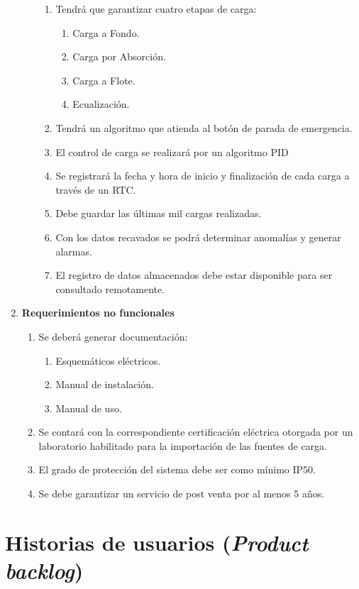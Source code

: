 \documentclass[11pt]{charter}
\begin{document}
\begin{enumerate}
\begin{enumerate}[label*=\arabic*.]
\begin{enumerate}[label*=\arabic*.]
				\item Tendrá que garantizar cuatro etapas de carga:
					\begin{enumerate}[label*=\arabic*.]
						\item Carga a Fondo.
						\item Carga por Absorción.
						\item Carga a Flote.
						\item Ecualización.
					\end{enumerate}
				\item Tendrá un algoritmo que atienda al botón de parada de emergencia.
				\item El control de carga se realizará por un algoritmo PID
				\item Se registrará la fecha y hora de inicio y finalización de cada carga a través de un RTC.
				\item Debe guardar las últimas mil cargas realizadas.
				\item Con los datos recavados se podrá determinar anomalías y generar alarmas. 
				\item El registro de datos almacenados debe estar disponible para ser consultado remotamente.
			\end{enumerate}					
	\end{enumerate}
	\item \textbf{Requerimientos no funcionales}
	\begin{enumerate}[label*=\arabic*.]
		\item Se deberá generar documentación:
			\begin{enumerate}[label*=\arabic*.]
				\item Esquemáticos eléctricos.
				\item Manual de instalación.
				\item Manual de uso.
			\end{enumerate}
		\item Se contará con la correspondiente certificación eléctrica otorgada por un laboratorio habilitado para la importación de las fuentes de carga.
		\item El grado de protección del sistema debe ser como mínimo IP50.
		\item Se debe garantizar un servicio de post venta por al menos 5 años.
	\end{enumerate}
\end{enumerate}

\newpage

\section{Historias de usuarios (\textit{Product backlog})}
\label{sec:backlog}
\end{document}
